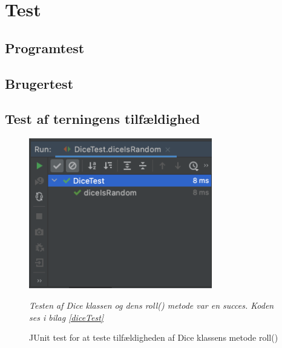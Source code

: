 \section{Test}


\subsection{Programtest}


\subsection{Brugertest}

\subsection{Test af terningens tilfældighed}
    \begin{figure}[H]
        \centering
        \includegraphics[width=8cm]{figures/diceIsRandomTest.png}
        \caption{JUnit test for at teste tilfældigheden af Dice klassens metode roll()}
        \emph{Testen af Dice klassen og dens roll() metode var en succes. Koden ses i bilag \ref{diceTest}}
    \end{figure}
    

